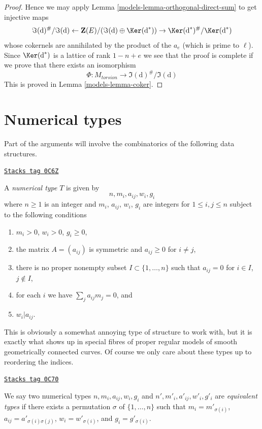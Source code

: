 \begin{proof}
\medskip\noindent
Hence we may apply Lemma \ref{models-lemma-orthogonal-direct-sum}
to get injective maps
$$
\Im(\text{d})^\#/\Im(\text{d}) \leftarrow
\mathbf{Z}(E)/(\Im(\text{d}) \oplus \Ker(\text{d}^*)) \rightarrow
\Ker(\text{d}^*)^\#/\Ker(\text{d}^*)
$$
whose cokernels are annihilated by the product of the $a_e$
(which is prime to $\ell$). Since $\Ker(\text{d}^*)$ is
a lattice of rank $1 - n + e$ we see that the proof is complete
if we prove that there exists an isomorphism
$$
\Phi : M_{torsion} \longrightarrow \Im(\text{d})^\#/\Im(\text{d})
$$
This is proved in Lemma \ref{models-lemma-coker}.
\end{proof}

\section{Numerical types}
\label{models-section-numerical-types}
Part of the arguments will involve the combinatorics of the following
data structures.

\begin{definition}[Type]
\label{models-definition-type}
\href{https://stacks.math.columbia.edu/tag/0C6Z}{\texttt{Stacks tag 0C6Z}}

A {\it numerical type} $T$ is given by
$$
n, m_i, a_{ij}, w_i, g_i
$$
where $n \geq 1$ is an integer and $m_i$, $a_{ij}$, $w_i$, $g_i$
are integers for $1 \leq i, j \leq n$ subject to the following conditions
\begin{enumerate}
\item $m_i > 0$, $w_i > 0$, $g_i \geq 0$,
\item the matrix $A = (a_{ij})$ is symmetric and $a_{ij} \geq 0$
for $i \not = j$,
\item there is no proper nonempty subset $I \subset \{1, \ldots, n\}$
such that $a_{ij} = 0$ for $i \in I$, $j \not \in I$,
\item for each $i$ we have $\sum_j a_{ij}m_j = 0$, and
\item $w_i | a_{ij}$.
\end{enumerate}
\end{definition}

This is obviously a somewhat annoying type of structure to work with,
but it is exactly what shows up in special fibres of proper regular
models of smooth geometrically connected curves.
Of course we only care about these types up to reordering the indices.

\begin{definition}
\label{models-definition-type-equivalent}
\href{https://stacks.math.columbia.edu/tag/0C70}{\texttt{Stacks tag 0C70}}

We say two numerical types $n, m_i, a_{ij}, w_i, g_i$ and
$n', m'_i, a'_{ij}, w'_i, g'_i$ are {\it equivalent types} if
there exists a permutation $\sigma$ of $\{1, \ldots, n\}$
such that $m_i = m'_{\sigma(i)}$, $a_{ij} = a'_{\sigma(i)\sigma(j)}$,
$w_i = w'_{\sigma(i)}$, and $g_i = g'_{\sigma(i)}$.
\end{definition}

